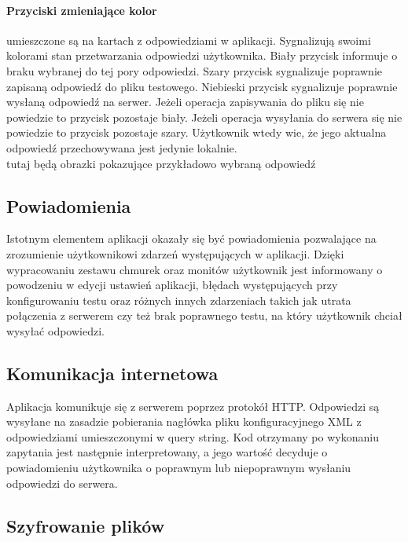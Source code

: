 \documentclass{report}
\begin{document}
		\paragraph{Przyciski zmieniające kolor}
		umieszczone są na kartach z odpowiedziami w aplikacji. Sygnalizują swoimi kolorami stan przetwarzania odpowiedzi użytkownika. Biały przycisk informuje o braku wybranej do tej pory odpowiedzi. Szary przycisk sygnalizuje poprawnie zapisaną odpowiedź do pliku testowego. Niebieski przycisk sygnalizuje poprawnie wysłaną odpowiedź na serwer.
		Jeżeli operacja zapisywania do pliku się nie powiedzie to przycisk pozostaje biały.
		Jeżeli operacja wysyłania do serwera się nie powiedzie to przycisk pozostaje szary. Użytkownik wtedy wie, że jego aktualna odpowiedź przechowywana jest jedynie lokalnie.\\
		
		tutaj będą obrazki pokazujące przykładowo wybraną odpowiedź\\
		
		\subsection{Powiadomienia}
		
		Istotnym elementem aplikacji okazały się być powiadomienia pozwalające na zrozumienie użytkownikowi zdarzeń występujących w aplikacji. Dzięki wypracowaniu zestawu chmurek oraz monitów użytkownik jest informowany o powodzeniu w edycji ustawień aplikacji, błędach występujących przy konfigurowaniu testu oraz różnych innych zdarzeniach takich jak utrata połączenia z serwerem czy też brak poprawnego testu, na który użytkownik chciał wysyłać odpowiedzi.
		
		\subsection{Komunikacja internetowa}
		
		Aplikacja komunikuje się z serwerem poprzez protokół HTTP. Odpowiedzi są wysyłane na zasadzie pobierania nagłówka pliku konfiguracyjnego XML z odpowiedziami umieszczonymi w query string. Kod otrzymany po wykonaniu zapytania jest następnie interpretowany, a jego wartość decyduje o powiadomieniu użytkownika o poprawnym lub niepoprawnym wysłaniu odpowiedzi do serwera.
	
		\subsection{Szyfrowanie plików}
	
\end{document}
